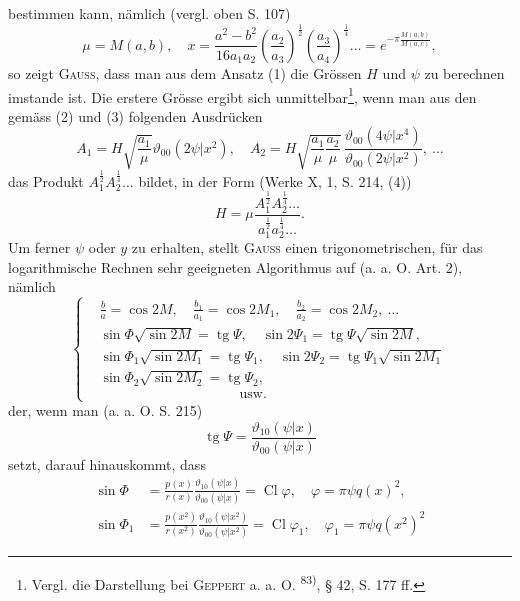 \noindent bestimmen kann, nämlich (vergl. oben S. 107)
\[
\mu=M(a,b),\quad x=\frac{a^2-b^2}{16a_1a_2}
\left(\frac{a_2}{a_3}\right)^{\frac12}
\left(\frac{a_3}{a_4}\right)^{\frac14}\ldots
=e^{-\pi\frac{M(a,b)}{M(a,c)}},
\]
so zeigt \textsc{Gauss}, dass man aus dem Ansatz (1) die Grössen \(H\) und \(\psi\) zu berechnen
imstande ist. Die erstere Grösse ergibt sich unmittelbar\footnote{Vergl. die Darstellung bei \textsc{Geppert} a. a. O. \textsuperscript{83)}, § 42, S. 177 ff.}, wenn
man aus den gemäss (2) und (3) folgenden Ausdrücken
\[
A_1=H\sqrt{\frac{a_1}{\mu}}\vartheta_{00}(2\psi|x^2),\quad
A_2=H\sqrt{\frac{a_1}{\mu}\frac{a_2}{\mu}}\,
\frac{\vartheta_{00}(4\psi|x^4)}{\vartheta_{00}(2\psi|x^2)},\ \ldots
\]
das Produkt \(A_1^{\frac12}A_2^{\frac14}\ldots\) bildet, in der Form (Werke X, 1, S. 214, (4))
\begingroup\makeatletter\tagsleft@true\let\veqno\leqno\makeatother
\begin{equation*}
H=\mu\frac{A_1^{\frac12}A_2^{\frac14}\ldots}{a_1^{\frac12}a_2^{\frac14}\ldots}.\tag{6}
\end{equation*}\endgroup
\noindent Um ferner \(\psi\) oder \(y\) zu erhalten, stellt \textsc{Gauss} einen trigonometrischen, für das
logarithmische Rechnen sehr geeigneten Algorithmus auf (a. a. O. Art. 2),
nämlich
\begingroup\makeatletter\tagsleft@true\let\veqno\leqno\makeatother
\begin{equation*}
\left\{\begin{aligned}
&\frac{b}{a}=\cos 2M,\quad\frac{b_1}{a_1}=\cos 2M_1,\quad\frac{b_2}{a_2}=\cos 2M_2,\ \ldots\\
&\sin\Phi\sqrt{\sin 2M}=\operatorname{tg}\Psi,\quad
\sin 2\Psi_1=\operatorname{tg}\Psi\sqrt{\sin 2M},\\
&\sin\Phi_1\sqrt{\sin 2M_1}=\operatorname{tg}\Psi_1,\quad
\sin 2\Psi_2=\operatorname{tg}\Psi_1\sqrt{\sin 2M_1}\\
&\sin\Phi_2\sqrt{\sin 2M_2}=\operatorname{tg}\Psi_2,\\
&\hspace{10em}\text{usw.}
\end{aligned}\right.\tag{7}
\end{equation*}\endgroup
\noindent der, wenn man (a. a. O. S. 215)
\begingroup\makeatletter\tagsleft@true\let\veqno\leqno\makeatother
\begin{equation*}
\operatorname{tg}\Psi=\frac{\vartheta_{10}(\psi|x)}{\vartheta_{00}(\psi|x)}\tag{8}
\end{equation*}\endgroup
\noindent setzt, darauf hinauskommt, dass
\[
\begin{aligned}
\sin\Phi&=\frac{p(x)}{r(x)}\frac{\vartheta_{10}(\psi|x)}{\vartheta_{00}(\psi|x)}
=\operatorname{Cl}\varphi,\quad\varphi=\pi\psi q(x)^2,\\
\sin\Phi_1&=\frac{p(x^2)}{r(x^2)}\frac{\vartheta_{10}(\psi|x^2)}{\vartheta_{00}(\psi|x^2)}
=\operatorname{Cl}\varphi_1,\quad\varphi_1=\pi\psi q(x^2)^2
\end{aligned}
\]
